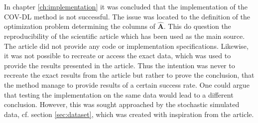 In chapter \ref{ch:implementation} it was concluded that the implementation of the COV-DL method is not successful.
The issue was located to the definition of the optimization problem determining the columns of $\hat{\mathbf{A}}$.  
This do question the reproducibility of the scientific article \cite{Balkan2015} which has been used as the main source. 
The article \cite{Balkan2015} did not provide any code or implementation specifications. 
Likewise, it was not possible to recreate or access the exact data, which was used to provide the results presented in the article. 
Thus the intention was never to recreate the exact results from the article but rather to prove the conclusion, that the method manage to provide results of a certain success rate.    
One could argue that testing the implementation on the same data would lead to a different conclusion. 
However, this was sought approached by the stochastic simulated data, cf. section \ref{sec:dataset}, which was created with inspiration from the article.

